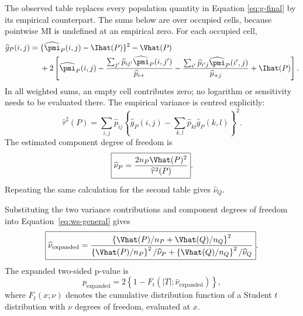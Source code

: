 \medskip
{}

The observed table replaces every population quantity in Equation
\eqref{eq:g-final} by its empirical counterpart. The sums below are over
occupied cells, because pointwise MI is undefined at an empirical zero. For
each occupied cell,
\begin{equation}
\begin{aligned}
\widehat g_P(i,j)
={}&\{\widehat\pmi_P(i,j)-\Ihat(P)\}^2-\Vhat(P)\\
&+2\left[
\widehat\pmi_P(i,j)
-\frac{\sum_{j'}\widehat p_{ij'}\widehat\pmi_P(i,j')}
       {\widehat p_{i+}}
-\frac{\sum_{i'}\widehat p_{i'j}\widehat\pmi_P(i',j)}
       {\widehat p_{+j}}
+\Ihat(P)
\right].
\end{aligned}
\label{eq:g-hat}
\end{equation}
In all weighted sums, an empty cell contributes zero; no logarithm or
sensitivity needs to be evaluated there. The empirical variance is centred
explicitly:
\begin{equation}
  \widehat\tau^2(P)
  =\sum_{i,j}\widehat p_{ij}
  \left\{\widehat g_P(i,j)
  -\sum_{k,l}\widehat p_{kl}\widehat g_P(k,l)\right\}^2.
  \label{eq:tau-hat}
\end{equation}
The estimated component degree of freedom is
\begin{equation}
  \boxed{
  \widehat\nu_P
  =\frac{2n_P\Vhat(P)^2}{\widehat\tau^2(P)}
  }.
  \label{eq:nu-p-hat}
\end{equation}
Repeating the same calculation for the second table gives
\(\widehat\nu_Q\).

\medskip
{}

Substituting the two variance contributions and component degrees of freedom
into Equation~\eqref{eq:ws-general} gives
\begin{equation}
  \boxed{
  \widehat\nu_{\mathrm{expanded}}
  =
  \frac{
  \left\{\Vhat(P)/n_P+\Vhat(Q)/n_Q\right\}^2
  }{
  \left\{\Vhat(P)/n_P\right\}^2/\widehat\nu_P
  +
  \left\{\Vhat(Q)/n_Q\right\}^2/\widehat\nu_Q
  }
  }.
  \label{eq:expanded-df}
\end{equation}
The expanded two-sided p-value is
\begin{equation}
  p_{\mathrm{expanded}}
  =2\left\{1-F_t(|T|;\widehat\nu_{\mathrm{expanded}})\right\},
  \label{eq:expanded-p}
\end{equation}
where \(F_t(x;\nu)\) denotes the cumulative distribution function of a
Student \(t\) distribution with \(\nu\) degrees of freedom, evaluated at \(x\).

